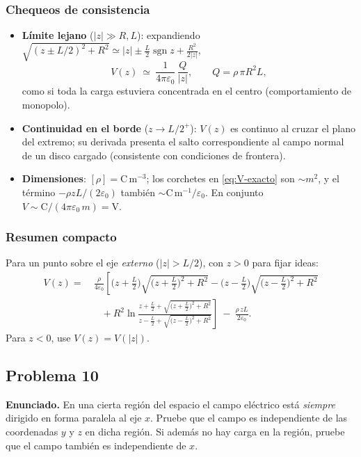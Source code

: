 \documentclass{article}
\begin{document}
\subsubsection*{Chequeos de consistencia}
\begin{itemize}
\item \textbf{Límite lejano} ($|z|\gg R,L$): expandiendo $\sqrt{(z\pm L/2)^2+R^2}\simeq |z|\pm \frac{L}{2}\operatorname{sgn}z+\frac{R^2}{2|z|}$,
\[
V(z)\ \simeq\ \frac{1}{4\pi\varepsilon_0}\,\frac{Q}{|z|},
\qquad Q=\rho\,\pi R^2 L,
\]
como si toda la carga estuviera concentrada en el centro (comportamiento de monopolo).
\item \textbf{Continuidad en el borde} ($z\to L/2^+$): $V(z)$ es continuo al cruzar el plano del extremo; su derivada presenta el salto correspondiente al campo normal de un disco cargado (consistente con condiciones de frontera).
\item \textbf{Dimensiones}: $[\rho]=\mathrm{C\,m^{-3}}$; los corchetes en \eqref{eq:V-exacto} son $\sim m^2$, y el término $-\rho zL/(2\varepsilon_0)$ también $\sim \mathrm{C\,m^{-1}}/\varepsilon_0$. En conjunto $V\sim\mathrm{C}/(4\pi\varepsilon_0\,m)=\mathrm{V}$.
\end{itemize}

\subsubsection*{Resumen compacto}
Para un punto sobre el eje \emph{externo} ($|z|>L/2$), con $z>0$ para fijar ideas:
\[
\boxed{
\begin{aligned}
V(z)=&\ \frac{\rho}{4\varepsilon_0}\left[
\big(z+\tfrac{L}{2}\big)\sqrt{\big(z+\tfrac{L}{2}\big)^2+R^2}
-\big(z-\tfrac{L}{2}\big)\sqrt{\big(z-\tfrac{L}{2}\big)^2+R^2}\right.\\
&\left.\quad+R^2\ln\!\frac{z+\tfrac{L}{2}+\sqrt{\big(z+\tfrac{L}{2}\big)^2+R^2}}
{z-\tfrac{L}{2}+\sqrt{\big(z-\tfrac{L}{2}\big)^2+R^2}}
\right]\ -\ \frac{\rho\,zL}{2\varepsilon_0}.
\end{aligned}}
\]
Para $z<0$, use $V(z)=V(|z|)$.


\subsection{Problema 10} \vspace{0.5cm}

\textbf{Enunciado.} En una cierta región del espacio el campo eléctrico está \emph{siempre} dirigido en forma paralela al eje $x$. Pruebe que el campo es independiente de las coordenadas $y$ y $z$ en dicha región. Si además no hay carga en la región, pruebe que el campo también es independiente de $x$.
\end{document}

